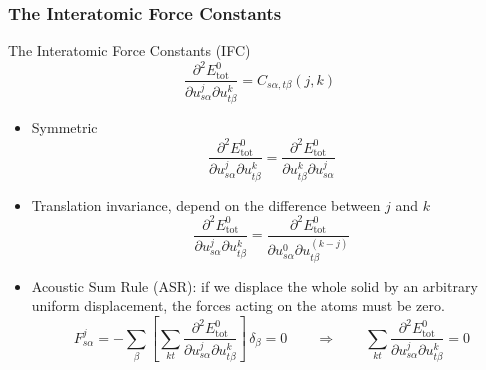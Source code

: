 \begin{frame}
  \frametitle{The Interatomic Force Constants}
  The Interatomic Force Constants (IFC)
  \begin{equation*}
    \frac{
      \partial^2 E^0_{\text{tot}}
    }{
      \partial {u}_{s\alpha}^j
      \partial {u}_{t\beta}^k
    }
    =
    C_{s\alpha, t\beta}(j, k)
  \end{equation*}

  \begin{itemize}
  \item Symmetric
    \begin{equation}
      \label{eq:ifc_sym_prop}
        \frac{
        \partial^2 E^0_{\text{tot}}
        }{
        \partial {u}_{s\alpha}^j
        \partial {u}_{t\beta}^k
        }
        =
        \frac{
        \partial^2 E^0_{\text{tot}}
        }{
        \partial {u}_{t\beta}^k
        \partial {u}_{s\alpha}^j
        }
    \end{equation}
  \item Translation invariance, depend on the difference between $j$ and $k$
    \begin{equation}
      \label{eq:ifc_ti_prop}
        \frac{
        \partial^2 E^0_{\text{tot}}
        }{
        \partial {u}_{s\alpha}^j
        \partial {u}_{t\beta}^k
        }
        =
        \frac{
        \partial^2 E^0_{\text{tot}}
        }{
        \partial {u}_{s\alpha}^0
        \partial {u}_{t\beta}^{(k-j)}
        }
    \end{equation}
  \item Acoustic Sum Rule (ASR): if we displace the whole solid by an arbitrary uniform
    displacement, the forces acting on the atoms must be zero.
    \begin{equation}
      \label{eq:ifc_asr_prop}
      F_{s\alpha}^j =
      - \sum_{\beta}
      \left[
        \sum_{kt}
        \frac{
        \partial^2 E^0_{\text{tot}}
        }{
        \partial {u}_{s\alpha}^j
        \partial {u}_{t\beta}^k
        }
      \right]
      \,
      \delta_\beta
      = 0
      \qquad\Rightarrow\qquad
      \sum_{kt}
        \frac{
        \partial^2 E^0_{\text{tot}}
        }{
        \partial {u}_{s\alpha}^j
        \partial {u}_{t\beta}^k
        } = 0
      \end{equation}
  \end{itemize}
\end{frame}